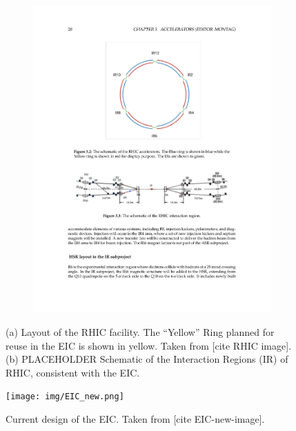 \begin{figure}[ht]
\begin{subfigure}{.35\linewidth}
        \includegraphics[width=\linewidth]{img/IR.pdf}
        \vspace{.5cm}
        \caption{}
        \label{fig:eic:IR}
    \end{subfigure}
    \caption{(a) Layout of the RHIC facility. The \enquote{Yellow} Ring planned for reuse in the EIC is shown in yellow. Taken from [cite RHIC image]. (b) PLACEHOLDER Schematic of the Interaction Regions (IR) of RHIC, consistent with the EIC.}
\end{figure}

\begin{figure}[ht]
    \centering
    \texttt{[image: img/EIC\_new.png]}
    \caption{Current design of the EIC. Taken from [cite EIC-new-image].}
    \label{fig:eic:eic}
\end{figure}


